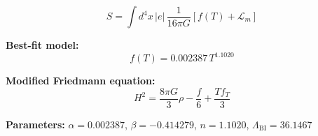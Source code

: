 
\begin{equation}
  S = \int d^4x \, |e| \, \frac{1}{16\pi G} \left[ f(T) + \mathcal{L}_m \right]
\end{equation}

\textbf{Best-fit model:}
\begin{equation}
  f(T) = 0.002387 \, T^{1.1020}
\end{equation}

\textbf{Modified Friedmann equation:}
\begin{equation}
  H^2 = \frac{8\pi G}{3} \rho - \frac{f}{6} + \frac{T f_T}{3}
\end{equation}

\textbf{Parameters:}
$\alpha = 0.002387$, \quad
$\beta = -0.414279$, \quad
$n = 1.1020$, \quad
$\Lambda_{\text{BI}} = 36.1467$